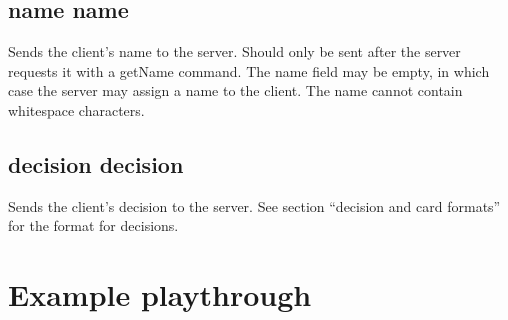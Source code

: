 \documentclass{article}
\begin{document}
\subsection{name \textlangle{}name\textrangle{}}
Sends the client's name to the server. Should only be sent after the server requests it with a getName command. The name field may be empty, in which case the server may assign a name to the client. The name cannot contain whitespace characters.

\subsection{decision \textlangle{}decision\textrangle{}}
Sends the client's decision to the server. See section ``decision and card formats'' for the format for decisions.

\section{Example playthrough}
\end{document}
